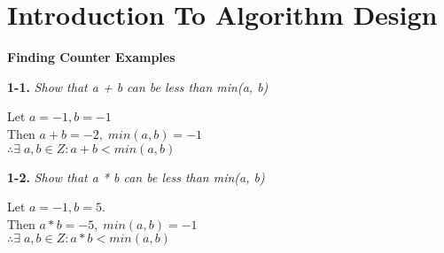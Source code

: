 \section{Introduction To Algorithm Design}

\textbf{Finding Counter Examples}

\textbf{1-1.} \emph{Show that a + b can be less than min(a, b)}
  \begin{center}
  Let $a = -1, b = -1$ \\ 
  Then $a + b = -2, \; min(a,b) = -1$ \\
  $\therefore \exists \; a, b \in Z : a+b < min(a,b)$
  \end{center}
  

\textbf{1-2.} \emph{Show that a * b can be less than min(a, b)}
  \begin{center}
  Let $a = -1, b = 5$. \\
  Then $a*b = -5, \; min(a,b) = -1$\\
  $\therefore \exists \; a, b \in Z : a*b < min(a,b)$
  \end{center}

